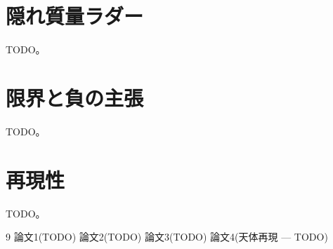 \documentclass[a4paper,10pt,twocolumn]{ltjsarticle}
\begin{document}
\section{隠れ質量ラダー}
TODO。

\section{限界と負の主張}
TODO。

\section{再現性}
TODO。

\begin{thebibliography}{9}
 論文1(TODO)
 論文2(TODO)
 論文3(TODO)
 論文4(天体再現 — TODO)
\end{thebibliography}
\end{document}
